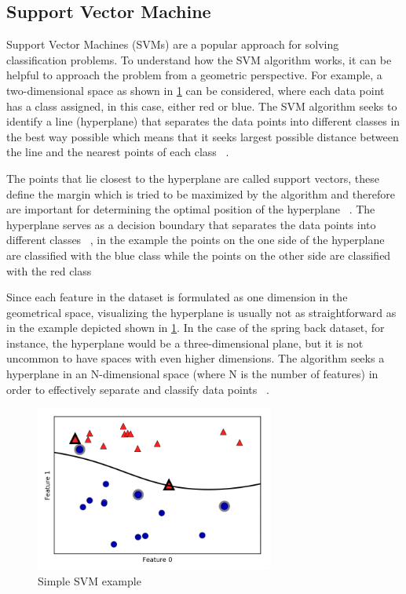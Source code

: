 \subsection{Support Vector Machine}\label{subsec:support-vector-regression-(svr)}
Support Vector Machines (SVMs) are a popular approach for solving classification problems.
To understand how the SVM algorithm works, it can be helpful to approach the problem from a geometric perspective.
For example, a two-dimensional space as shown in \cref{fig:svm-example} can be considered, where each data point
has a class assigned, in this case, either red or blue.
The SVM algorithm seeks to identify a line (hyperplane) that separates the data points into different classes in the
best way possible which means that it seeks largest possible distance between the line and the
nearest points of each class
~\cite[pp. 92--96]{muller2016introduction}.

The points that lie closest to the hyperplane are called support vectors, these define the margin which is tried to be
maximized by the algorithm and therefore are important for determining the optimal position of the hyperplane
~\cite[p. 42]{awad2015efficient}.
The hyperplane serves as a decision boundary that separates the data points into different
classes~\cite[p. 11]{awad2015efficient}
, in the example the points on the one side of the hyperplane are classified with the blue class while the
points on the other side are classified with the red class

Since each feature in the dataset is formulated as one dimension in the geometrical space, visualizing the hyperplane
is usually not as straightforward as in the example depicted shown in \cref{fig:svm-example}.
In the case of the spring back dataset, for instance, the hyperplane would be a three-dimensional plane, but it is
not uncommon to have spaces with even higher dimensions.
The algorithm seeks a hyperplane in an N-dimensional space (where N is the number of features) in order to
effectively separate and classify data points
~\cite[]{awad2015efficient}.

\begin{figure}[H]
    \begin{tcolorbox}[arc=0pt,boxrule=0.5pt, colback=white]
        \centering
        \includegraphics[width=0.7\textwidth]{chap4/images/svm_example}
    \end{tcolorbox}
    \caption{Simple \ac{SVM} example~\cite[p. 94]{muller2016introduction}}
    \label{fig:svm-example}
\end{figure}

